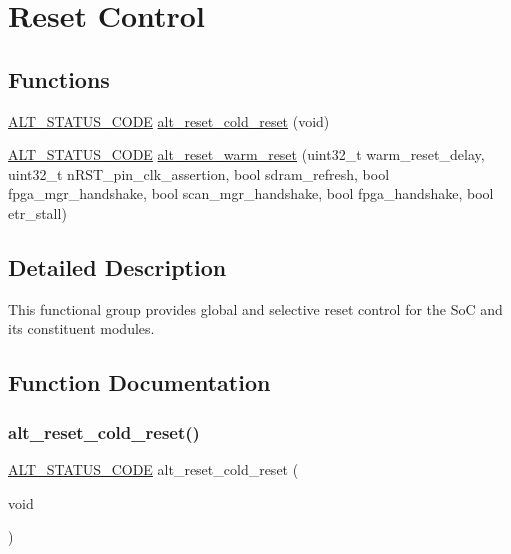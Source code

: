 \hypertarget{group__RST__MGR__CTRL}{}\section{Reset Control}
\label{group__RST__MGR__CTRL}
\subsection*{Functions}
\begin{DoxyCompactItemize}
\item 
\mbox{\hyperlink{hwlib_8h_abdb0d369f069723ca55d6c94bcaaaa12}{A\+L\+T\+\_\+\+S\+T\+A\+T\+U\+S\+\_\+\+C\+O\+DE}} \mbox{\hyperlink{group__RST__MGR__CTRL_gad5cff5af2df89bdebe7eaba8b6d98bb8}{alt\+\_\+reset\+\_\+cold\+\_\+reset}} (void)
\item 
\mbox{\hyperlink{hwlib_8h_abdb0d369f069723ca55d6c94bcaaaa12}{A\+L\+T\+\_\+\+S\+T\+A\+T\+U\+S\+\_\+\+C\+O\+DE}} \mbox{\hyperlink{group__RST__MGR__CTRL_gadc95a7b3024a7bed53740cb45d6b0d69}{alt\+\_\+reset\+\_\+warm\+\_\+reset}} (uint32\+\_\+t warm\+\_\+reset\+\_\+delay, uint32\+\_\+t n\+R\+S\+T\+\_\+pin\+\_\+clk\+\_\+assertion, bool sdram\+\_\+refresh, bool fpga\+\_\+mgr\+\_\+handshake, bool scan\+\_\+mgr\+\_\+handshake, bool fpga\+\_\+handshake, bool etr\+\_\+stall)
\end{DoxyCompactItemize}


\subsection{Detailed Description}
This functional group provides global and selective reset control for the SoC and its constituent modules. 

\subsection{Function Documentation}
\mbox{\label{group__RST__MGR__CTRL_gad5cff5af2df89bdebe7eaba8b6d98bb8}} 
\subsubsection{\texorpdfstring{alt\_reset\_cold\_reset()}{alt\_reset\_cold\_reset()}}
{\footnotesize\ttfamily \mbox{\hyperlink{hwlib_8h_abdb0d369f069723ca55d6c94bcaaaa12}{A\+L\+T\+\_\+\+S\+T\+A\+T\+U\+S\+\_\+\+C\+O\+DE}} alt\+\_\+reset\+\_\+cold\+\_\+reset (\begin{DoxyParamCaption}\item[{void}]{ }\end{DoxyParamCaption})}

